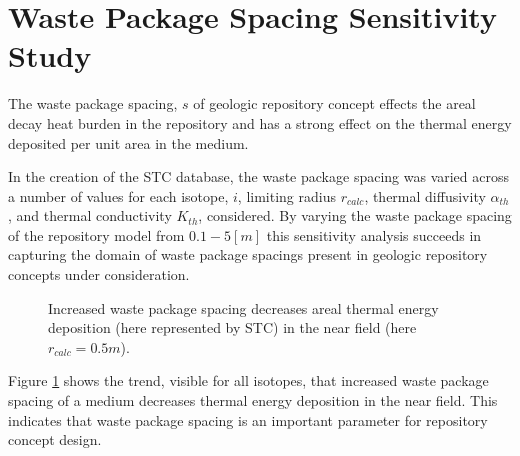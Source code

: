 \section{Waste Package Spacing Sensitivity Study}\label{sec:spacing}
The waste package spacing, $s$ of geologic repository concept effects the areal 
decay heat burden in the repository and has a strong effect on the thermal 
energy deposited per unit area in the medium. 

In the creation of the \gls{STC} database, the waste package spacing was varied 
across a number of values for each isotope, $i$, limiting 
radius $r_{calc}$, thermal diffusivity $\alpha_{th}$, and thermal conductivity $K_{th}$, considered.  By 
varying the waste package spacing of the repository model from $0.1-5 [m]$
this sensitivity analysis succeeds in capturing the domain of 
waste package spacings present in geologic repository concepts under 
consideration. 

\begin{figure}[htbp!]
\begin{center}
\end{center}
\caption[$K_{th}$ Sensitivity for Low $\alpha_{th}$]{Increased waste package 
spacing decreases areal thermal energy deposition 
(here represented by \gls{STC}) in the near field (here $r_{calc} = 0.5m$).}
\label{fig:Cm242alpha_kth_low}
\end{figure}

Figure \ref{fig:Cm242alpha_kth_low} shows the trend, visible for all isotopes, 
that increased waste package spacing of a medium decreases thermal energy 
deposition in the near field. This indicates that waste package spacing is 
an important parameter for repository concept design.


